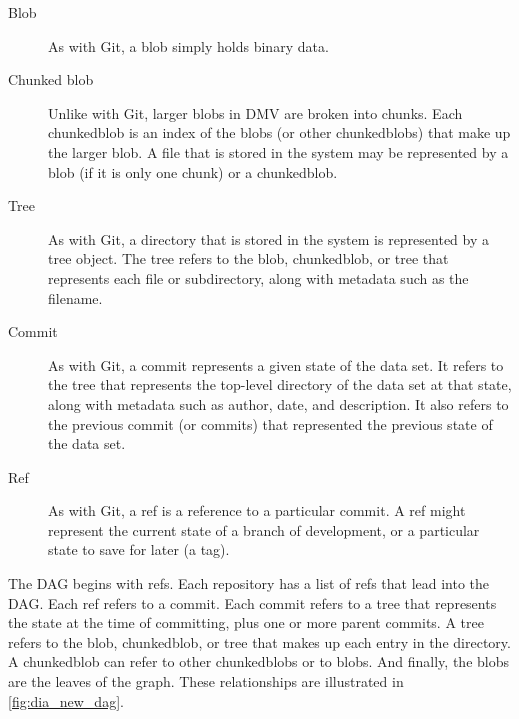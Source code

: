 \begin{description}

    \item[Blob] As with Git, a \gls{blob} simply holds binary data.

    \item[Chunked blob] Unlike with Git, larger \glspl{blob} in \gls{DMV} are
        broken into chunks. Each \gls{chunkedblob} is an index of the
        \glspl{blob} (or other \glspl{chunkedblob}) that make up the larger
        \gls{blob}. A file that is stored in the system may be represented by a
        \gls{blob} (if it is only one chunk) or a \gls{chunkedblob}.

    \item[Tree] As with Git, a directory that is stored in the system is
        represented by a \gls{tree} object. The \gls{tree} refers to the
        \gls{blob}, \gls{chunkedblob}, or \gls{tree} that represents each file
        or subdirectory, along with metadata such as the filename.

    \item[Commit] As with Git, a \gls{commit} represents a given state of the
        data set. It refers to the \gls{tree} that represents the top-level
        directory of the data set at that state, along with metadata such as
        author, date, and description. It also refers to the previous
        \gls{commit} (or \glspl{commit}) that represented the previous state of
        the data set.

    \item[Ref] As with Git, a \gls{ref} is a reference to a particular
        \gls{commit}. A \gls{ref} might represent the current state of a branch of
        development, or a particular state to save for later (a tag).

\end{description}

The \gls{DAG} begins with \glspl{ref}. Each repository has a list of \glspl{ref}
that lead into the \gls{DAG}. Each \gls{ref} refers to a \gls{commit}. Each
\gls{commit} refers to a \gls{tree} that represents the state at the time of
committing, plus one or more parent \glspl{commit}. A \gls{tree} refers to the
\gls{blob}, \gls{chunkedblob}, or \gls{tree} that makes up each entry in the
directory. A \gls{chunkedblob} can refer to other \glspl{chunkedblob} or to
\glspl{blob}. And finally, the \glspl{blob} are the leaves of the graph. These
relationships are illustrated in \autoref{fig:dia_new_dag}.



